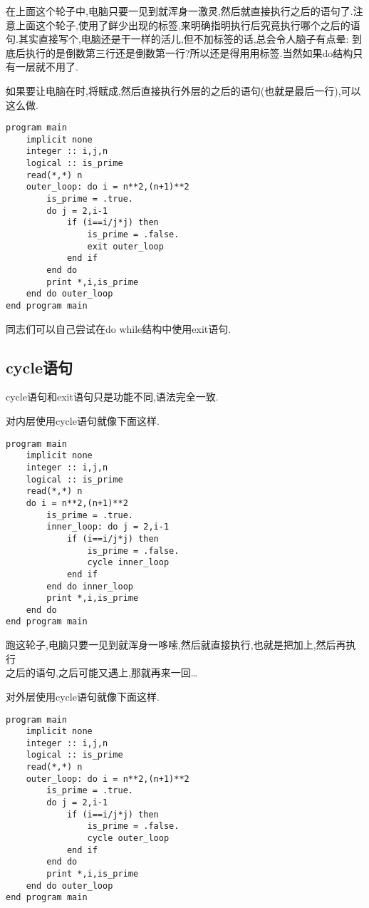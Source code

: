 在上面这个轮子中,电脑只要一见到就浑身一激灵,然后就直接执行之后的语句了.注意上面这个轮子,使用了鲜少出现的标签,来明确指明执行后究竟执行哪个之后的语句.其实直接写个,电脑还是干一样的活儿,但不加标签的话,总会令人脑子有点晕: 到底后执行的是倒数第三行还是倒数第一行?所以还是得用用标签.当然如果do结构只有一层就不用了.

如果要让电脑在时,将赋成,然后直接执行外层的之后的语句(也就是最后一行),可以这么做.
\begin{lstlisting}
program main
    implicit none
    integer :: i,j,n
    logical :: is_prime
    read(*,*) n
    outer_loop: do i = n**2,(n+1)**2
        is_prime = .true.
        do j = 2,i-1
            if (i==i/j*j) then
                is_prime = .false.
                exit outer_loop
            end if
        end do
        print *,i,is_prime
    end do outer_loop
end program main
\end{lstlisting}

同志们可以自己尝试在do while结构中使用exit语句.

\subsection{cycle语句}\label{fortran_cycle}

cycle语句和exit语句只是功能不同,语法完全一致.

对内层使用cycle语句就像下面这样.
\begin{lstlisting}
program main
    implicit none
    integer :: i,j,n
    logical :: is_prime
    read(*,*) n
    do i = n**2,(n+1)**2
        is_prime = .true.
        inner_loop: do j = 2,i-1
            if (i==i/j*j) then
                is_prime = .false.
                cycle inner_loop
            end if
        end do inner_loop
        print *,i,is_prime
    end do
end program main
\end{lstlisting}

跑这轮子,电脑只要一见到就浑身一哆嗦,然后就直接执行,也就是把加上,然后再执行\\之后的语句,之后可能又遇上,那就再来一回\dots

对外层使用cycle语句就像下面这样.
\begin{lstlisting}
program main
    implicit none
    integer :: i,j,n
    logical :: is_prime
    read(*,*) n
    outer_loop: do i = n**2,(n+1)**2
        is_prime = .true.
        do j = 2,i-1
            if (i==i/j*j) then
                is_prime = .false.
                cycle outer_loop
            end if
        end do
        print *,i,is_prime
    end do outer_loop
end program main
\end{lstlisting}

